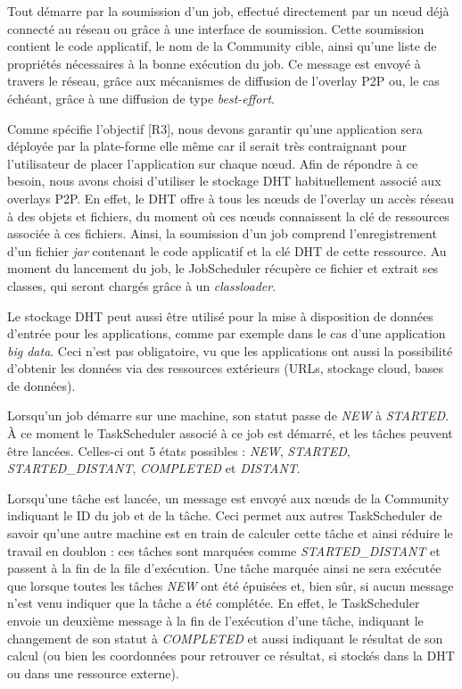 Tout démarre par la soumission d'un job, effectué directement par un n{\oe}ud déjà connecté au réseau ou grâce à une interface de soumission. Cette soumission contient le code applicatif, le nom de la Community cible, ainsi qu'une liste de propriétés nécessaires à la bonne exécution du job. Ce message est envoyé à travers le réseau, grâce aux mécanismes de diffusion de l'overlay P2P ou, le cas échéant, grâce à une diffusion de type \textit{best-effort}.

Comme spécifie l'objectif [R3], nous devons garantir qu'une application sera déployée par la plate-forme elle même car il serait très contraignant pour l'utilisateur de placer l'application sur chaque n{\oe}ud. Afin de répondre à ce besoin, nous avons choisi d'utiliser le stockage DHT habituellement associé aux overlays P2P. En effet, le DHT offre à tous les n{\oe}uds de l'overlay un accès réseau à des objets et fichiers, du moment où ces n{\oe}uds connaissent la clé de ressources associée à ces fichiers. Ainsi, la soumission d'un job comprend l'enregistrement d'un fichier \textit{jar} contenant le code applicatif et la clé DHT de cette ressource. Au moment du lancement du job, le JobScheduler récupère ce fichier et extrait ses classes, qui seront chargés grâce à un \textit{classloader}. 

Le stockage DHT peut aussi être utilisé pour la mise à disposition de données d'entrée pour les applications, comme par exemple dans le cas d'une application \textit{big data}. Ceci n'est pas obligatoire, vu que les applications ont aussi la possibilité d'obtenir les données via des ressources extérieurs (URLs, stockage cloud, bases de données).

Lorsqu'un job démarre sur une machine, son statut passe de \textit{NEW} à \textit{STARTED}. À ce moment le TaskScheduler associé à ce job est démarré, et les tâches peuvent être lancées. Celles-ci ont 5 états possibles : \textit{NEW}, \textit{STARTED}, \textit{STARTED\_DISTANT}, \textit{COMPLETED} et \textit{DISTANT}. 

Lorsqu'une tâche est lancée, un message est envoyé aux n{\oe}uds de la Community indiquant le ID du job et de la tâche. Ceci permet aux autres TaskScheduler de savoir qu'une autre machine est en train de calculer cette tâche et ainsi réduire le travail en doublon : ces tâches sont marquées comme \textit{STARTED\_DISTANT} et passent à la fin de la file d'exécution. Une tâche marquée ainsi ne sera exécutée que lorsque toutes les tâches \textit{NEW} ont été épuisées et, bien sûr, si aucun message n'est venu indiquer que la tâche a été complétée. En effet, le TaskScheduler envoie un deuxième message à la fin de l'exécution d'une tâche, indiquant le changement de son statut à \textit{COMPLETED} et aussi indiquant le résultat de son calcul (ou bien les coordonnées pour retrouver ce résultat, si stockés dans la DHT ou dans une ressource externe).

